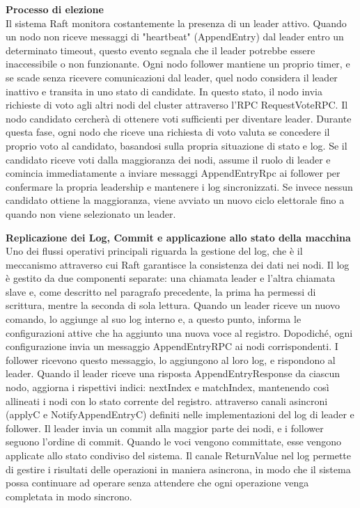 \textbf{Processo di elezione}\\
Il sistema Raft monitora costantemente la presenza di un leader attivo. Quando un nodo non riceve messaggi di "heartbeat" (AppendEntry) dal leader entro un determinato timeout, questo evento segnala che il leader potrebbe essere 
inaccessibile o non funzionante. Ogni nodo follower mantiene un proprio timer, e se scade senza ricevere comunicazioni dal leader, quel nodo considera il leader inattivo e transita in uno stato di candidate.
In questo stato, il nodo invia richieste di voto agli altri nodi del cluster attraverso l'RPC RequestVoteRPC. Il nodo candidato cercherà di ottenere voti sufficienti per diventare leader. Durante questa fase, 
ogni nodo che riceve una richiesta di voto valuta se concedere il proprio voto al candidato, basandosi sulla propria situazione di stato e log.
Se il candidato riceve voti dalla maggioranza dei nodi, assume il ruolo di leader e comincia immediatamente a inviare messaggi AppendEntryRpc ai follower per confermare la propria leadership e mantenere i log sincronizzati. 
Se invece nessun candidato ottiene la maggioranza, viene avviato un nuovo ciclo elettorale fino a quando non viene selezionato un leader. 

\textbf{Replicazione dei Log, Commit e applicazione allo stato della macchina}\\
Uno dei flussi operativi principali riguarda la gestione del log, che è il meccanismo attraverso cui Raft garantisce la consistenza dei dati nei nodi. Il log è gestito da due componenti separate: una chiamata leader e l'altra 
chiamata slave e, come descritto nel paragrafo precedente, la prima ha permessi di scrittura, mentre la seconda di sola lettura.
Quando un leader riceve un nuovo comando, lo aggiunge al suo log interno e, a questo punto, informa le configurazioni attive che ha aggiunto una nuova voce al registro. Dopodiché, ogni configurazione invia un messaggio 
AppendEntryRPC ai nodi corrispondenti.
I follower ricevono questo messaggio, lo aggiungono al loro log, e rispondono al leader. 
Quando il leader riceve una risposta AppendEntryResponse da ciascun nodo, aggiorna i rispettivi indici: nextIndex e matchIndex, mantenendo così allineati i nodi con lo stato corrente del registro.
attraverso canali asincroni (applyC e NotifyAppendEntryC) definiti nelle implementazioni del log di leader e follower. Il leader invia un commit alla maggior parte dei nodi, e i follower seguono l'ordine di commit. 
Quando le voci vengono committate, esse vengono applicate allo stato condiviso del sistema.
Il canale ReturnValue nel log permette di gestire i risultati delle operazioni in maniera asincrona, in modo che il sistema possa continuare ad operare senza attendere che ogni operazione venga completata in modo sincrono.

